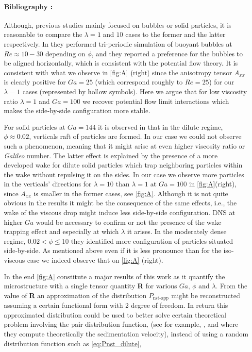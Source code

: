 \paragraph*{Bibliography : } 
Although, previous studies mainly focused on bubbles or solid particles, it is reasonable to compare the $\lambda = 1$ and $10$ cases to the former and the latter respectively. 
In \citet{bunner2002} they performed tri-periodic simulation of buoyant bubbles at $Re \approx 10-30$ depending on $\phi$, and they reported a preference  for the bubbles to be aligned horizontally, which is consistent with the potential flow theory. 
It is consistent with what we observe in \ref{fig:A} (right) since the anisotropy tensor $A_{xx}$ is clearly positive for $Ga = 25$ (which correspond roughly to $Re = 25$) for our $\lambda = 1$ cases (represented by hollow symbols). 
Here we argue that for low viscosity ratio $\lambda = 1$ and $Ga = 100$ we recover potential flow limit interactions which makes the side-by-side configuration more stable. 


For solid particles at $Ga = 144$ it is observed in \citet{shajahan2023inertial} that in the dilute regime, $\phi \approx 0.02$, verticals raft of particles are formed. 
In our case we could not observe such a phenomenon, meaning that it might arise at even higher viscosity ratio or \textit{Galileo} number. 
The latter effect is explained by the presence of a more developed wake for dilute solid particles which trap neighboring particles within the wake without repulsing it on the sides. 
In our case we observe more particles in the verticals' directions for $\lambda = 10$ than $\lambda =1$ at $Ga =100$ in \ref{fig:A}(right), since $A_{xx}$ is smaller in the former cases, see \ref{fig:A}.
Although it is not quite obvious in the results it might be the consequence of the same effects, i.e., the wake of the viscous drop might induce less side-by-side configuration. 
DNS at higher $Ga$ would be necessary to confirm or not the presence of the wake trapping effect and especially at which $\lambda$ it arises.  
In the moderately dense regime,  $0.02 < \phi \le 10$ they identified more configuration of particles situated side-by-side. 
As mentioned above even if it is less pronounce than for the iso-viscous case we indeed observe that on \ref{fig:A} (right). 


In the end \ref{fig:A} constitute a major results of this work as it quantify the microstructure with a single tensor quantity \textbf{R} for various $Ga$, $\phi$ and $\lambda$. 
From the value of \textbf{R} an approximation of the distribution $P_\text{nst-app}$ might be reconstructed assuming a certain functional form with 2 degree of freedom. 
In return this approximated distribution could be used to better solve certain theoretical problem involving the pair distribution function, (see for example, \citet{batchelor1972sedimentation}, \citep{hinch1977averaged} and \citep{zhang2021ensemble} where they compute theoretically the sedimentation velocity), instead of using a random distribution function such as \ref{eq:Pnst_dilute}, 


